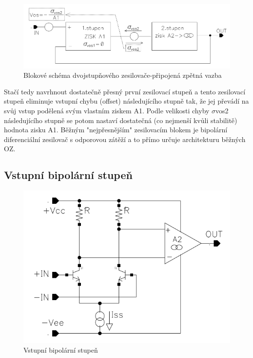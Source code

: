 \begin{figure}[h]
   \begin{center}
     \includegraphics[scale=0.5]{images/dvojOZ2.png}
   \end{center}
   \caption{Blokové schéma dvojstupňového zesilovače-připojená zpětná vazba}
\end{figure}

Stačí tedy navrhnout dostatečně přesný první zesilovací stupeň a tento zesilovací stupeň eliminuje vstupní chybu (offset) následujícího stupně tak, že jej převádí na svůj vstup podělená svým vlastním ziskem A1. Podle velikosti chyby $\sigma$vos2 následujícího stupně se potom nastaví dostatečná (co nejmenší kvůli stabilitě) hodnota zisku A1. Běžným "nejpřesnějším" zesilovacím blokem je bipolární diferenciální zesilovač s odporovou zátěží a to přímo určuje architekturu běžných OZ.

\subsection{Vstupní bipolární stupeň}

\begin{figure}[h]
   \begin{center}
     \includegraphics[scale=0.5]{images/prvnistupen.png}
   \end{center}
   \caption{Vstupní bipolární stupeň}
\end{figure}

